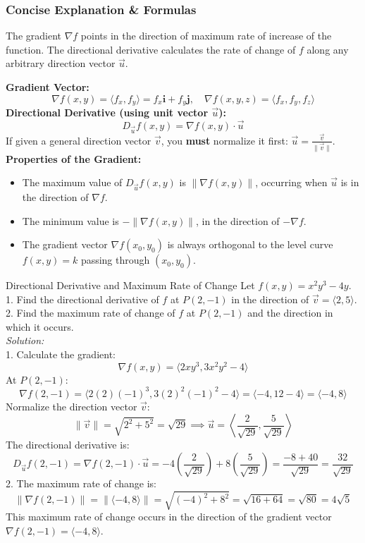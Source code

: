 \documentclass[11pt]{article}
\begin{document}
\subsubsection*{Concise Explanation \& Formulas}
The gradient $\nabla f$ points in the direction of maximum rate of increase of the function. The directional derivative calculates the rate of change of $f$ along any arbitrary direction vector $\vec{u}$.
\begin{formulabox}
    \textbf{Gradient Vector:}
    \[ \nabla f(x,y) = \langle f_x, f_y \rangle = f_x\mathbf{i} + f_y\mathbf{j}, \quad \nabla f(x,y,z) = \langle f_x, f_y, f_z \rangle \]
    \textbf{Directional Derivative (using unit vector $\vec{u}$):}
    \[ D_{\vec{u}}f(x,y) = \nabla f(x,y) \cdot \vec{u} \]
    If given a general direction vector $\vec{v}$, you \textbf{must} normalize it first: $\vec{u} = \frac{\vec{v}}{\|\vec{v}\|}$.\\
    \textbf{Properties of the Gradient:}
    \begin{itemize}
        \item The maximum value of $D_{\vec{u}}f(x,y)$ is $\|\nabla f(x,y)\|$, occurring when $\vec{u}$ is in the direction of $\nabla f$.
        \item The minimum value is $-\|\nabla f(x,y)\|$, in the direction of $-\nabla f$.
        \item The gradient vector $\nabla f(x_0,y_0)$ is always orthogonal to the level curve $f(x,y)=k$ passing through $(x_0,y_0)$.
    \end{itemize}
\end{formulabox}

\begin{examplebox}{Directional Derivative and Maximum Rate of Change}
    Let $f(x,y) = x^2y^3 - 4y$.\\
    1. Find the directional derivative of $f$ at $P(2,-1)$ in the direction of $\vec{v} = \langle 2,5 \rangle$.\\
    2. Find the maximum rate of change of $f$ at $P(2,-1)$ and the direction in which it occurs.\\
    \textit{Solution:}\\
    1. Calculate the gradient:
    \[ \nabla f(x,y) = \langle 2xy^3, 3x^2y^2 - 4 \rangle \]
    At $P(2,-1)$:
    \[ \nabla f(2,-1) = \langle 2(2)(-1)^3, 3(2)^2(-1)^2 - 4 \rangle = \langle -4, 12 - 4 \rangle = \langle -4, 8 \rangle \]
    Normalize the direction vector $\vec{v}$:
    \[ \|\vec{v}\| = \sqrt{2^2 + 5^2} = \sqrt{29} \implies \vec{u} = \left\langle \frac{2}{\sqrt{29}}, \frac{5}{\sqrt{29}} \right\rangle \]
    The directional derivative is:
    \[ D_{\vec{u}}f(2,-1) = \nabla f(2,-1) \cdot \vec{u} = -4\left(\frac{2}{\sqrt{29}}\right) + 8\left(\frac{5}{\sqrt{29}}\right) = \frac{-8 + 40}{\sqrt{29}} = \frac{32}{\sqrt{29}} \]
    2. The maximum rate of change is:
    \[ \|\nabla f(2,-1)\| = \|\langle -4, 8 \rangle\| = \sqrt{(-4)^2 + 8^2} = \sqrt{16 + 64} = \sqrt{80} = 4\sqrt{5} \]
    This maximum rate of change occurs in the direction of the gradient vector $\nabla f(2,-1) = \langle -4, 8 \rangle$.
\end{examplebox}
\end{document}
